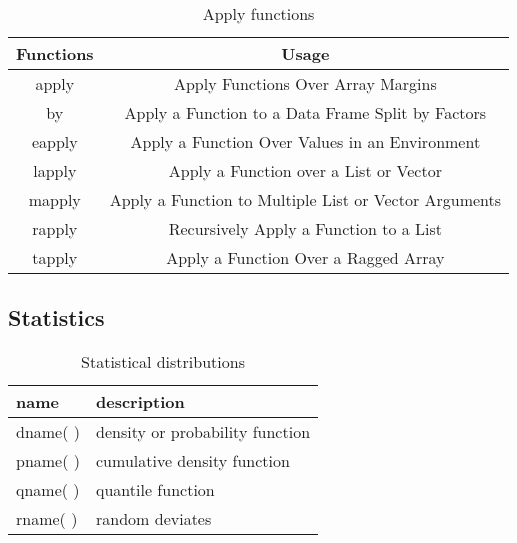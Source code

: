 \documentclass[11pt,a4paper]{article}
\newcommand{\1}{\mathbb{1}}
\begin{document}
\begin{table}
\caption{Apply functions}
\begin{center}
\begin{tabular}{cc}
\hline
Functions    &      Usage\\ \hline
apply        &    Apply Functions Over Array Margins \\
by           &     Apply a Function to a Data Frame Split by Factors \\
eapply       &    Apply a Function Over Values in an Environment \\
lapply       &     Apply a Function over a List or Vector \\
mapply       &     Apply a Function to Multiple List or Vector Arguments \\
rapply       &     Recursively Apply a Function to a List \\
tapply       &     Apply a Function Over a Ragged Array \\
\hline 
\end{tabular} 
\end{center}
\end{table}
\FloatBarrier

\subsection{Statistics}
\FloatBarrier

\begin{table}
\caption{Statistical distributions}
\begin{center}
\begin{tabular}{ll}
name &	description\\ \hline
dname( ) &	density or probability function\\
pname( ) &	cumulative density function\\
qname( ) &	quantile function\\
rname( ) &	random deviates \\ \hline 
\end{tabular} 
\end{center}
\end{table}
\end{document}
